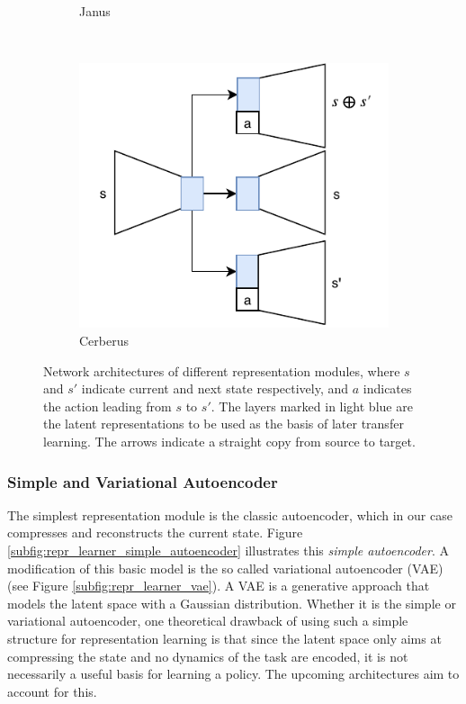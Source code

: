 \begin{figure}[t!]
\begin{subfigure}{0.5\columnwidth}
		\caption{Janus}
		\label{subfig:repr_learner_janus}
	\end{subfigure}%
	~ 
	\begin{subfigure}{0.5\columnwidth}
		\centering
		\includegraphics[width=\linewidth]{img/cerberus_v2.pdf}
		\caption{Cerberus}
		\label{subfig:repr_learner_cerberus}
	\end{subfigure}
	\caption{Network architectures of different representation modules, where $s$ and $s'$ indicate current and next state respectively, and $a$ indicates the action leading from $s$ to $s'$. 
	The layers marked in light blue are the latent representations to be used as the basis of later transfer learning. 
	The arrows indicate a straight copy from source to target.
	}
	\label{fig:repr_learner}
\end{figure}

\subsubsection{Simple and Variational Autoencoder}
The simplest representation module is the classic autoencoder, which in our case compresses and reconstructs the current state. Figure \ref{subfig:repr_learner_simple_autoencoder} illustrates this \textit{simple autoencoder}. A modification of this basic model is the so called variational autoencoder (VAE) \citep{vae} (see Figure \ref{subfig:repr_learner_vae}). A VAE is a generative approach that models the latent space with a Gaussian distribution. Whether it is the simple or variational autoencoder, one theoretical drawback of using such a simple structure for representation learning is that since the latent space only aims at compressing the state and no dynamics of the task are encoded, it is not necessarily a useful basis for learning a policy. The upcoming architectures aim to account for this.

